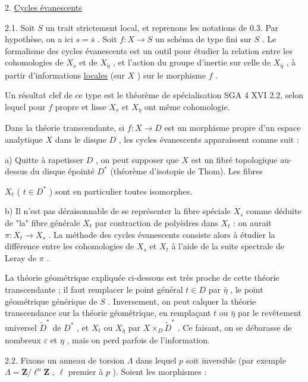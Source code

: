 2. \underline{Cycles évanescents}

2.1.    Soit  $S$  un trait strictement local, et reprenons les notations de 0.3. Par hypothèse, on a ici  $s = \bar{s}$ . Soit  $f : X \longrightarrow S$  un schéma de type fini sur  $S$ . Le formalisme des cycles évanescents est un outil pour étudier la relation entre les cohomologies de  $X_s$  et de  $X_{\bar{\eta}}$ , et l'action du groupe d'inertie sur celle de  $X_{\bar{\eta}}$ , à partir d'informations \underline{locales} (sur  $X$ ) sur le morphisme  $f$ .

Un résultat clef de ce type est le théorème de spécialisation SGA 4 XVI 2.2, selon lequel pour  $f$  propre et lisse  $X_s$  et  $X_{\bar{\eta}}$  ont même cohomologie.

Dans la théorie transcendante, si  $f : X \longrightarrow D$  est un morphisme propre d'un espace analytique  $X$  dans le disque  $D$ , les cycles évanescents apparaissent comme suit :

a) Quitte à rapetisser  $D$ , on peut supposer que  $X$  est un fibré topologique au-dessus du disque épointé  $D^{*}$  (théorème d'isotopie de Thom). Les fibres



$X_t$ ( $t \in D^{*}$ )  sont en particulier toutes isomorphes.

b) Il n'est pas déraisonnable de se représenter la fibre spéciale  $X_s$  comme déduite de "la" fibre générale  $X_t$  par contraction de polyèdres dans  $X_t$ : on aurait $\pi : X_t \longrightarrow X_s$ . La méthode des cycles évanescents consiste alors à étudier la différence entre les cohomologies de  $X_s$  et  $X_t$  à l'aide de la suite spectrale de Leray de  $\pi$ .

La théorie géométrique expliquée ci-dessous est très proche de cette théorie transcendante ; il faut remplacer le point général  $t \in D$  par  $\bar{\eta}$ , le point géométrique générique de  $S$ . Inversement, on peut calquer la théorie transcendance sur la théorie géométrique, en remplaçant  $t$  ou  $\bar{\eta}$  par le revêtement universel  $\widetilde{D}^{*}$  de  $D^{*}$ , et $X_t$  ou  $X_{\bar{\eta}}$  par  $X \times_D \widetilde{D}^{*}$ . Ce faisant, on se débarasse de nombreux  $\varepsilon$  et  $\eta$ , mais on perd parfois de l'information.

2.2. Fixons un anneau de torsion  $\Lambda$  dans lequel  $p$  soit inversible (par exemple $\Lambda = \mathbf{Z}/\ell^n\mathbf{Z}$ ,  $\ell$  premier à  $p$ ). Soient les morphismes :

